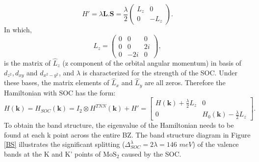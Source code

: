 \documentclass[12pt,english,a4paper]{article}
\begin{document}
	\begin{equation}
		H' = \lambda \textbf{L}.\textbf{S}=\frac{\lambda}{2}\begin{pmatrix}
			L_z &0\\
			0 & -L_z
		\end{pmatrix}.
	\end{equation}
In which,
	\begin{equation}
		L_z = \begin{pmatrix}
			0 & 0 & 0\\
			0 & 0 & 2i\\
			0 & -2i& 0
		\end{pmatrix},
	\end{equation}
is the matrix of $\hat{L}_z$ (z component of the orbital angular momentum) in basis of $d_{z^2}, d_{xy}$ and $d_{x^2-y^2}$, and $\lambda$ is characterized for the strength of the SOC. Under these bases, the matrix elements of $\hat{L}_x$ and $\hat{L}_y$ are all zeros. Therefore the Hamiltonian with SOC has the form:
	\begin{equation}
		H(\textbf{k}) = H_{SOC} (\textbf{k}) = I_2 \otimes H^{TNN} (\textbf{k}) +H' = \begin{bmatrix}
			H (\textbf{k}) + \frac{\lambda}{2} L_z & 0\\
			0& H_0 (\textbf{k}) - \frac{\lambda}{2} L_z
		\end{bmatrix}.
	\end{equation}
\quad To obtain the band structure, the eigenvalue of the Hamiltonian needs to be found at each k point across the entire BZ. The band structure diagram in Figure \ref{BS} illustrates the significant splitting ($\Delta_{SOC}^\lambda = 2\lambda= 146$  \(meV\)) of the valence bands at the K and K' points of $\mathrm{MoS}_2$ caused by the SOC.
\end{document}
